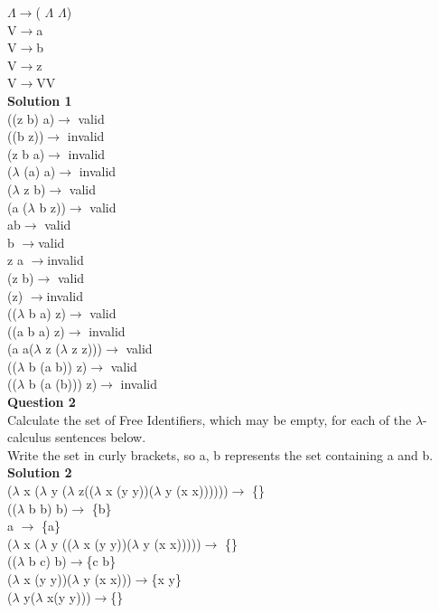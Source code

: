 \documentclass{article}
\begin{document}
 $\Lambda$$\rightarrow$( $\Lambda$ $\Lambda$)\\
V$\rightarrow$a\\
V$\rightarrow$b\\
V$\rightarrow$z\\
V$\rightarrow$VV\\
\textbf{Solution 1}\\
((z b) a)$\rightarrow$ valid\\
((b z))$\rightarrow$ invalid\\
(z b a)$\rightarrow$ invalid\\
($\lambda$ (a) a)$\rightarrow$ invalid\\
($\lambda$ z b)$\rightarrow$ valid\\
(a ($\lambda$ b z))$\rightarrow$ valid\\
ab$\rightarrow$ valid\\
b $\rightarrow$valid\\
z a $\rightarrow$invalid\\
(z b)$\rightarrow$ valid\\
(z) $\rightarrow$invalid\\
(($\lambda$ b a) z)$\rightarrow$ valid\\
((a b a) z)$\rightarrow$ invalid\\
(a a($\lambda$ z ($\lambda$ z z)))$\rightarrow$ valid\\
(($\lambda$ b (a b)) z)$\rightarrow$ valid\\
(($\lambda$ b (a (b))) z)$\rightarrow$ invalid\\
\textbf{Question 2}\\
Calculate the set of Free Identifiers, which may be empty, for each of the $\lambda$-calculus sentences below.\\
Write the set in curly brackets, so {a, b} represents the set containing a and b.\\
\textbf{Solution 2}\\
($\lambda$ x ($\lambda$ y ($\lambda$ z(($\lambda$ x (y y))($\lambda$ y (x x))))))$\rightarrow$ \{\} \\
(($\lambda$ b b) b)$\rightarrow$ \{b\} \\
a $\rightarrow$ \{a\} \\
($\lambda$ x ($\lambda$ y (($\lambda$ x (y y))($\lambda$ y (x x)))))$\rightarrow$ \{\} \\
(($\lambda$ b c) b)$\rightarrow$\{c b\} \\
($\lambda$ x (y y))($\lambda$ y (x x)))$\rightarrow$\{x y\} \\
($\lambda$ y($\lambda$ x(y y)))$\rightarrow$\{\} \\
$$
\end{document}
